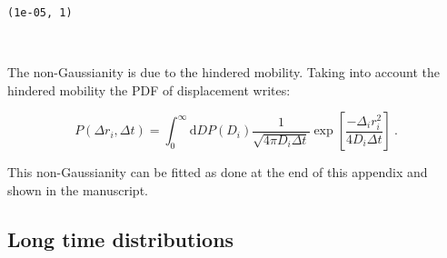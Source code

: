 \documentclass[11pt]{article}
\makeatletter
\newcommand{\boxspacing}{\kern\kvtcb@left@rule\kern\kvtcb@boxsep}
\newcommand{\prompt}[4]{
        {\ttfamily\llap{{\color{#2}[#3]:\hspace{3pt}#4}}\vspace{-\baselineskip}}
    }
\makeatother
\begin{document}
            \begin{tcolorbox}[breakable, size=fbox, boxrule=.5pt, pad at break*=1mm, opacityfill=0]
\prompt{Out}{outcolor}{18}{\boxspacing}
\begin{Verbatim}[commandchars=\\\{\}]
(1e-05, 1)
\end{Verbatim}
\end{tcolorbox}
        
    \begin{center}
    \end{center}
    { \hspace*{\fill} \\}
    
    The non-Gaussianity is due to the hindered mobility. Taking into account
the hindered mobility the PDF of displacement writes:

\begin{equation} P(\Delta r_i , \Delta t) = \int_0 ^\infty \mathrm{d}DP(D_i) \frac{1}{\sqrt{4 \pi D_i \Delta t}} \exp\left[ \frac{-\Delta_i r_i ^2}{4D_i\Delta t} \right]~. \end{equation}

This non-Gaussianity can be fitted as done at the end of this appendix
and shown in the manuscript.

    \hypertarget{long-time-distributions}{%
\subsection{Long time distributions}\label{long-time-distributions}}
\end{document}
